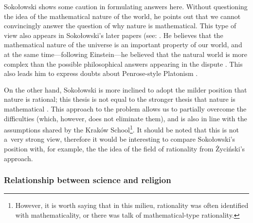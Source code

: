 Sokołowski shows some caution in formulating answers here. Without questioning the idea of the mathematical nature of the world, he points out that we cannot convincingly answer the question of why nature is mathematical. This type of view also appears in Sokołowski's later papers (see: 
\parencite[][p.65]{}. %
 He believes that the mathematical nature of the universe is an important property of our world, and at the same time---following Einstein---he believed that the natural world is more complex than the possible philosophical answers appearing in the dispute 
\parencites[][pp.190–191]{}[][p.67]{}. %
 This also leads him to express doubts about Penrose-style Platonism 
\parencite[][p.218]{}.%




On the other hand, Sokołowski is more inclined to adopt the milder position that nature is rational; this thesis is not equal to the stronger thesis that nature is mathematical 
\parencite[][p.215]{}. %
 This approach to the problem allows us to partially overcome the difficulties (which, however, does not eliminate them), and is also in line with the assumptions shared by the Kraków School\footnote{However, it is worth saying that in this milieu, rationality was often identified with mathematicality, or there was talk of mathematical-type rationality.}. It should be noted that this is not a~very strong view, therefore it would be interesting to compare Sokołowski's position with, for example, the the idea of the field of rationality from Życiński's approach.



\subsubsection{Relationship between science and religion}



